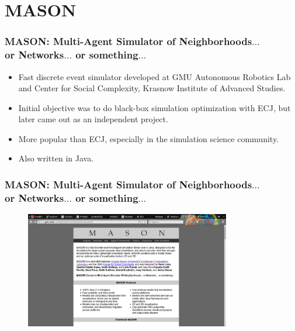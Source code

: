 \documentclass{beamer}
\begin{document}
\section{MASON}		%
\begin{frame}
	\frametitle{MASON: \textbf{M}ulti-\textbf{A}gent \textbf{S}imulator of \textbf{N}eighborhoods\(\ldots\)\\or \textbf{N}etworks\(\ldots\) or something\(\ldots\)}
	\begin{itemize}
		\item Fast discrete event simulator developed at GMU Autonomous Robotics Lab and Center for Social Complexity, Krasnow Institute of Advanced Studies.
		\item Initial objective was to do black-box simulation optimization with ECJ, but later came out as an independent project.
		\item More popular than ECJ, especially in the simulation science community.
		\item Also written in Java.
	\end{itemize}
\end{frame}
\begin{frame}
	\frametitle{MASON: \textbf{M}ulti-\textbf{A}gent \textbf{S}imulator of \textbf{N}eighborhoods\(\ldots\)\\or \textbf{N}etworks\(\ldots\) or something\(\ldots\)}
	\begin{figure}
		\includegraphics[width=0.8\textwidth,keepaspectratio]{mason-url.pdf}
	\end{figure}
\end{frame}
\end{document}
